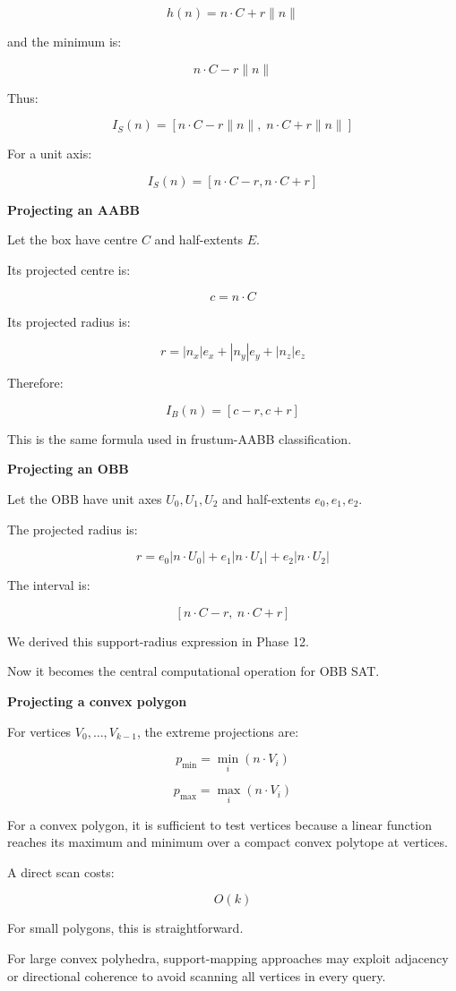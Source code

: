 \[
h(n)=n\cdot C+r\|n\|
\]

and the minimum is:

\[
n\cdot C-r\|n\|
\]

Thus:

\[
\boxed{ I_S(n)= [n\cdot C-r\|n\|,\; n\cdot C+r\|n\|] }
\]

For a unit axis:

\[
I_S(n)=[n\cdot C-r,n\cdot C+r]
\]

\textbf{Projecting an AABB}

Let the box have centre \(C\) and half-extents \(E\).

Its projected centre is:

\[
c=n\cdot C
\]

Its projected radius is:

\[
\boxed{ r=|n_x|e_x+|n_y|e_y+|n_z|e_z }
\]

Therefore:

\[
\boxed{I_B(n)=[c-r,c+r]}
\]

This is the same formula used in frustum-AABB classification.

\textbf{Projecting an OBB}

Let the OBB have unit axes \(U_0,U_1,U_2\) and half-extents \(e_0,e_1,e_2\).

The projected radius is:

\[
\boxed{ r= e_0|n\cdot U_0| + e_1|n\cdot U_1| + e_2|n\cdot U_2| }
\]

The interval is:

\[
\boxed{ [n\cdot C-r,\ n\cdot C+r] }
\]

We derived this support-radius expression in Phase 12.

Now it becomes the central computational operation for OBB SAT.

\textbf{Projecting a convex polygon}

For vertices \(V_0,\ldots,V_{k-1}\), the extreme projections are:

\[
p_{\min}=\min_i(n\cdot V_i)
\]

\[
p_{\max}=\max_i(n\cdot V_i)
\]

For a convex polygon, it is sufficient to test vertices because a linear function reaches its maximum and minimum over a compact convex polytope at vertices.

A direct scan costs:

\[
O(k)
\]

For small polygons, this is straightforward.

For large convex polyhedra, support-mapping approaches may exploit adjacency or directional coherence to avoid scanning all vertices in every query.

